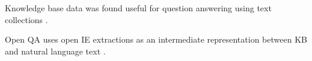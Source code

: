 
Knowledge base data was found useful for question answering using text collections \cite{Sun:2015:ODQ:2736277.2741651}.

Open QA uses open IE extractions as an intermediate representation between KB and natural language text \cite{Fader:2014:OQA:2623330.2623677}.